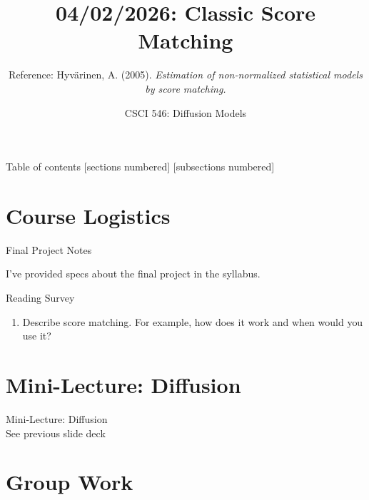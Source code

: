 \documentclass[10pt]{beamer}
\title{04/02/2026: Classic Score Matching}
\author{Reference: Hyv\"arinen, A. (2005). \textit{Estimation of non-normalized statistical models by score matching.} }
\date{CSCI 546: Diffusion Models}
\begin{document}
\maketitle


\begin{frame}{Table of contents}
  [sections numbered]
  [subsections numbered]
  \tableofcontents
\end{frame}





\section{Course Logistics}



\begin{frame}{Final Project Notes}
\begin{myredbox}[title=Announcement]

I've provided specs about the final project in the syllabus.
\end{myredbox}
\end{frame}


\begin{frame}{Reading Survey}

\begin{enumerate}
	\item Describe score matching.  For example, how does it work and when would you use it?
\end{enumerate}
	
\end{frame}




\section{Mini-Lecture: Diffusion}


\begin{frame}[standout]
Mini-Lecture: Diffusion \\
See previous slide deck
\end{frame}




\section{Group Work}
\end{document}
